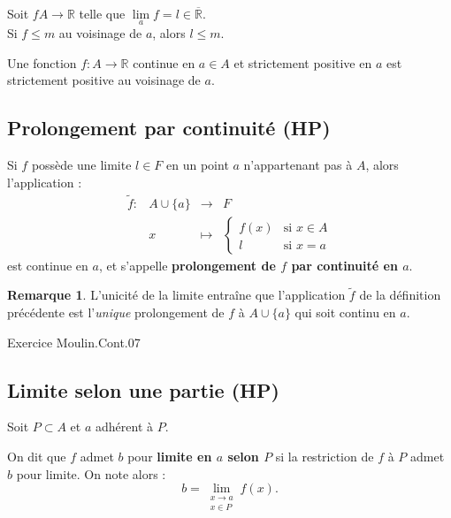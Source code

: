 \documentclass[french]{article}
\newcommand{\R}{\mathbb{R}}
\theoremstyle{plain}
\theoremstyle{definition}
\newtheorem*{rmq}{Remarque}
\theoremstyle{remark}
\begin{document}
\begin{thm}{}%
	Soit $fA\to\R$ telle que $\underset{a}{\lim}f=l\in\overline{\R}$. \\
	Si $f\leqslant m$ au voisinage de $a$, alors $l\leqslant m$.
\end{thm}

\begin{thm}{}%
	Une fonction $f:A\to\R$ continue en $a\in A$ et strictement positive en $a$ est strictement positive au voisinage de $a$.
\end{thm}
\subsection{Prolongement par continuité (HP)}

\begin{dfn}
	Si $f$ possède une limite $l\in F$ en un point $a$ n'appartenant pas à $A$, alors l'application : $$\begin{array}{lrcl}
		\tilde{f}:&A\cup\{a\}&\longrightarrow&F\\
		&x&\longmapsto&\displaystyle\begin{cases}
			f(x)&\text{si  }x\in A\\
			l&\text{si  }x=a
		\end{cases}
	\end{array}$$ est continue en $a$, et s'appelle \textbf{prolongement de $f$ par continuité en $a$}.
\end{dfn}

\begin{rmq}
	L'unicité de la limite entraîne que l'application $\tilde{f}$ de la définition précédente est l'\textit{unique} prolongement de $f$ à $A\cup\{a\}$ qui soit continu en $a$.
\end{rmq}

Exercice Moulin.Cont.07

\subsection{Limite selon une partie (HP)}

Soit $P\subset A$ et $a$ adhérent à $P$.

\begin{dfn}
	On dit que $f$ admet $b$ pour \textbf{limite en $a$ selon $P$} si la restriction de $f$ à $P$ admet $b$ pour limite. On note alors : $$b=\underset{\substack{x\to a\\ x\in P}}{\lim}f(x).$$
\end{dfn}
\end{document}
